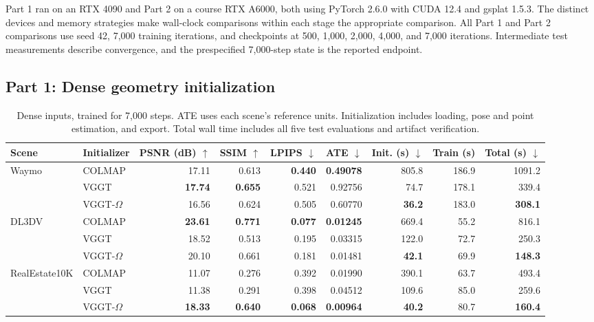 Part 1 ran on an RTX 4090 and Part 2 on a course RTX A6000, both using PyTorch 2.6.0 with CUDA 12.4 and gsplat 1.5.3. The distinct devices and memory strategies make wall-clock comparisons within each stage the appropriate comparison. All Part 1 and Part 2 comparisons use seed 42, 7,000 training iterations, and checkpoints at 500, 1,000, 2,000, 4,000, and 7,000 iterations. Intermediate test measurements describe convergence, and the prespecified 7,000-step state is the reported endpoint.

\subsection{Part 1: Dense geometry initialization}
\label{sec:part1}

\begin{table}[!t]
  \centering\small
  \begin{tabular}{llrrrrrrr}
    \toprule
    Scene & Initializer & PSNR (dB) $\uparrow$ & SSIM $\uparrow$ & LPIPS $\downarrow$ &
    ATE $\downarrow$ & Init. (s) $\downarrow$ & Train (s) & Total (s) $\downarrow$ \\
    \midrule
    Waymo & COLMAP & 17.11 & 0.613 & \textbf{0.440} & \textbf{0.49078} & 805.8 & 186.9 & 1091.2 \\
          & VGGT & \textbf{17.74} & \textbf{0.655} & 0.521 & 0.92756 & 74.7 & 178.1 & 339.4 \\
          & VGGT-$\Omega$ & 16.56 & 0.624 & 0.505 & 0.60770 & \textbf{36.2} & 183.0 & \textbf{308.1} \\
    \midrule
    DL3DV & COLMAP & \textbf{23.61} & \textbf{0.771} & \textbf{0.077} & \textbf{0.01245} & 669.4 & 55.2 & 816.1 \\
          & VGGT & 18.52 & 0.513 & 0.195 & 0.03315 & 122.0 & 72.7 & 250.3 \\
          & VGGT-$\Omega$ & 20.10 & 0.661 & 0.181 & 0.01481 & \textbf{42.1} & 69.9 & \textbf{148.3} \\
    \midrule
    RealEstate10K & COLMAP & 11.07 & 0.276 & 0.392 & 0.01990 & 390.1 & 63.7 & 493.4 \\
                  & VGGT & 11.38 & 0.291 & 0.398 & 0.04512 & 109.6 & 85.0 & 259.6 \\
                  & VGGT-$\Omega$ & \textbf{18.33} & \textbf{0.640} & \textbf{0.068} & \textbf{0.00964} & \textbf{40.2} & 80.7 & \textbf{160.4} \\
    \bottomrule
  \end{tabular}
  \caption{Dense inputs, trained for 7,000 steps. ATE uses each scene's reference units. Initialization includes loading, pose and point estimation, and export. Total wall time includes all five test evaluations and artifact verification.}
  \label{tab:dense}
\end{table}

